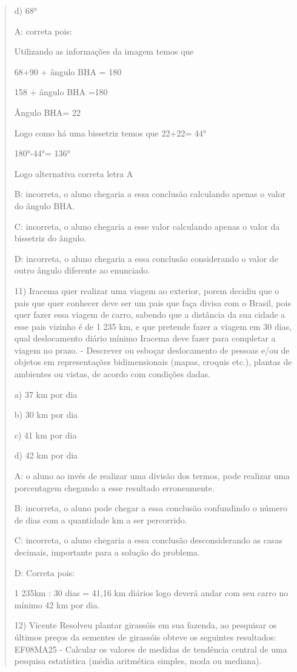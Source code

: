 \begin{quote}
\begin{escolha}
d) 68°

A: correta pois:

Utilizando as informações da imagem temos que

68+90 + ângulo BHA = 180

158 + ângulo BHA =180

Ângulo BHA= 22

Logo como há uma bissetriz temos que 22+22= 44°

180°-44°= 136°

Logo alternativa correta letra A

B: incorreta, o aluno chegaria a essa conclusão calculando apenas o
valor do ângulo BHA.

C: incorreta, o aluno chegaria a esse valor calculando apenas o valor da
bissetriz do ângulo.

D: incorreta, o aluno chegaria a essa conclusão considerando o valor de
outro ângulo diferente ao enunciado.

11) Iracema quer realizar uma viagem ao exterior, porem decidiu que o
pais que quer conhecer deve ser um pais que faça divisa com o Brasil,
pois quer fazer essa viagem de carro, sabendo que a distância da sua
cidade a esse pais vizinho é de 1 235 km, e que pretende fazer a viagem
em 30 dias, qual deslocamento diário mínimo Iracema deve fazer para
completar a viagem no prazo. - Descrever ou esboçar deslocamento de
pessoas e/ou de objetos em representações bidimensionais (mapas, croquis
etc.), plantas de ambientes ou vistas, de acordo com condições dadas.

a) 37 km por dia

b) 30 km por dia

c) 41 km por dia

d) 42 km por dia

A: o aluno ao invés de realizar uma divisão dos termos, pode realizar
uma porcentagem chegando a esse resultado erroneamente.

B: incorreta, o aluno pode chegar a essa conclusão confundindo o número
de dias com a quantidade km a ser percorrido.

C: incorreta, o aluno chegaria a essa conclusão desconsiderando as casas
decimais, importante para a solução do problema.

D: Correta pois:

1 235km : 30 dias = 41,16 km diários logo deverá andar com seu carro no
mínimo 42 km por dia.

12) Vicente Resolveu plantar girassóis em sua fazenda, ao pesquisar os
últimos preços da sementes de girassóis obteve os seguintes resultados:
EF08MA25 - Calcular os valores de medidas de tendência central de uma
pesquisa estatística (média aritmética simples, moda ou mediana).


\end{escolha}
\end{quote}
